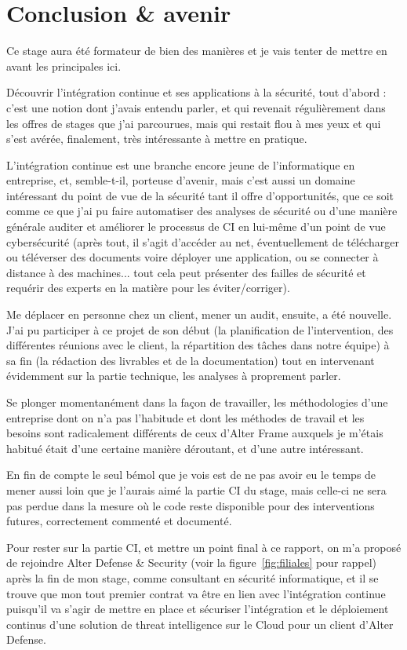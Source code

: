 \section{Conclusion \& avenir}
\label{sec:ccl}
Ce stage aura été formateur de bien des manières et je vais tenter de mettre en avant les principales ici. 

Découvrir l'intégration continue et ses applications à la sécurité, tout d'abord : c'est une notion dont j'avais entendu parler, et qui revenait régulièrement dans les offres de stages que j'ai parcourues, mais qui restait flou à mes yeux et qui s'est avérée, finalement, très intéressante à mettre en pratique. 

L'intégration continue est une branche encore jeune de l'informatique en entreprise, et, semble-t-il, porteuse d'avenir, mais c'est aussi un domaine intéressant du point de vue de la sécurité tant il offre d'opportunités, que ce soit comme ce que j'ai pu faire automatiser des analyses de sécurité ou d'une manière générale auditer et améliorer le processus de CI en lui-même d'un point de vue cybersécurité (après tout, il s'agit d'accéder au net, éventuellement de télécharger ou téléverser des documents voire déployer une application, ou se connecter à distance à des machines... tout cela peut présenter des failles de sécurité et requérir des experts en la matière pour les éviter/corriger). 

Me déplacer en personne chez un client, mener un audit, ensuite, a été nouvelle. J'ai pu participer à ce projet de son début (la planification de l'intervention, des différentes réunions avec le client, la répartition des tâches dans notre équipe) à sa fin (la rédaction des livrables et de la documentation) tout en intervenant évidemment sur la partie technique, les analyses à proprement parler. 

Se plonger momentanément dans la façon de travailler, les méthodologies d'une entreprise dont on n'a pas l'habitude et dont les méthodes de travail et les besoins sont radicalement différents de ceux d'Alter Frame auxquels je m'étais habitué était d'une certaine manière déroutant, et d'une autre intéressant. 

En fin de compte le seul bémol que je vois est de ne pas avoir eu le temps de mener aussi loin que je l'aurais aimé la partie CI du stage, mais celle-ci ne sera pas perdue dans la mesure où le code reste disponible pour des interventions futures, correctement commenté et documenté. 

Pour rester sur la partie CI, et mettre un point final à ce rapport, on m'a proposé de rejoindre Alter Defense \& Security (voir la figure~\ref{fig:filiales} pour rappel) après la fin de mon stage, comme consultant en sécurité informatique, et il se trouve que mon tout premier contrat va être en lien avec l'intégration continue puisqu'il va s'agir de mettre en place et sécuriser l'intégration et le déploiement continus d'une solution de threat intelligence\cite{threat_intell_wiki} sur le Cloud pour un client d'Alter Defense.

